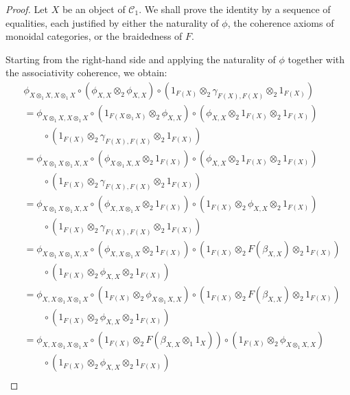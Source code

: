\documentclass{amsart}
\begin{document}
\begin{proof}
Let $X$ be an object of $\mathcal{C}_1$. We shall prove the identity by a sequence of equalities, each justified by either the naturality of $\phi$, the coherence axioms of monoidal categories, or the braidedness of $F$.

Starting from the right-hand side and applying the naturality of $\phi$ together with the associativity coherence, we obtain:
\begin{align*}
&\phi_{X\otimes_1 X, X\otimes_1 X} \circ (\phi_{X,X} \otimes_2 \phi_{X,X}) \circ (1_{F(X)} \otimes_2 \gamma_{F(X),F(X)} \otimes_2 1_{F(X)}) \\
&= \phi_{X\otimes_1 X, X\otimes_1 X} \circ (1_{F(X\otimes_1 X)} \otimes_2 \phi_{X,X}) \circ (\phi_{X,X} \otimes_2 1_{F(X)} \otimes_2 1_{F(X)}) \\
&\qquad \circ (1_{F(X)} \otimes_2 \gamma_{F(X),F(X)} \otimes_2 1_{F(X)}) \tag{naturality of $\phi$} \\
&= \phi_{X\otimes_1 X\otimes_1 X, X} \circ (\phi_{X\otimes_1 X, X} \otimes_2 1_{F(X)}) \circ (\phi_{X,X} \otimes_2 1_{F(X)} \otimes_2 1_{F(X)}) \\
&\qquad \circ (1_{F(X)} \otimes_2 \gamma_{F(X),F(X)} \otimes_2 1_{F(X)}) \tag{associativity coherence} \\
&= \phi_{X\otimes_1 X\otimes_1 X, X} \circ (\phi_{X, X\otimes_1 X} \otimes_2 1_{F(X)}) \circ (1_{F(X)} \otimes_2 \phi_{X,X} \otimes_2 1_{F(X)}) \\
&\qquad \circ (1_{F(X)} \otimes_2 \gamma_{F(X),F(X)} \otimes_2 1_{F(X)}) \tag{naturality of $\phi$} \\
&= \phi_{X\otimes_1 X\otimes_1 X, X} \circ (\phi_{X, X\otimes_1 X} \otimes_2 1_{F(X)}) \circ (1_{F(X)} \otimes_2 F(\beta_{X,X}) \otimes_2 1_{F(X)}) \\
&\qquad \circ (1_{F(X)} \otimes_2 \phi_{X,X} \otimes_2 1_{F(X)}) \tag{braidedness of $F$} \\
&= \phi_{X, X\otimes_1 X\otimes_1 X} \circ (1_{F(X)} \otimes_2 \phi_{X\otimes_1 X, X}) \circ (1_{F(X)} \otimes_2 F(\beta_{X,X}) \otimes_2 1_{F(X)}) \\
&\qquad \circ (1_{F(X)} \otimes_2 \phi_{X,X} \otimes_2 1_{F(X)}) \tag{naturality of $\phi$} \\
&= \phi_{X, X\otimes_1 X\otimes_1 X} \circ (1_{F(X)} \otimes_2 F(\beta_{X,X} \otimes_1 1_X)) \circ (1_{F(X)} \otimes_2 \phi_{X\otimes_1 X, X}) \\
&\qquad \circ (1_{F(X)} \otimes_2 \phi_{X,X} \otimes_2 1_{F(X)}) \tag{functoriality of $F$} \\

\end{align*}
\end{proof}
\end{document}
